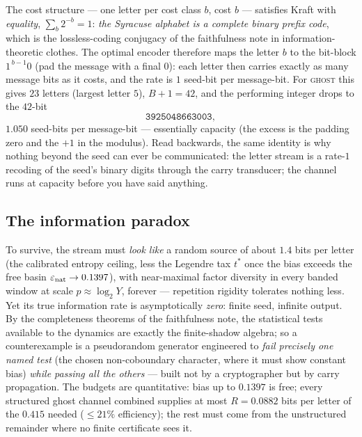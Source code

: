 \documentclass[10pt]{article}
\begin{document}
The cost structure --- one letter per cost class $b$, cost $b$ ---
satisfies Kraft with \emph{equality}, $\sum_b 2^{-b}=1$: \emph{the
Syracuse alphabet is a complete binary prefix code}, which is the
lossless-coding conjugacy of the faithfulness note in
information-theoretic clothes. The optimal encoder therefore maps the
letter $b$ to the bit-block $1^{\,b-1}0$ (pad the message with a final
$0$): each letter then carries exactly as many message bits as it
costs, and the rate is $1$ seed-bit per message-bit. For
\textsc{ghost} this gives $23$ letters (largest letter $5$),
$B+1=42$, and the performing integer drops to the $42$-bit
\[
\texttt{3925048663003},
\]
$1.050$ seed-bits per message-bit --- essentially capacity (the excess
is the padding zero and the $+1$ in the modulus). Read backwards, the
same identity is why nothing beyond the seed can ever be communicated:
the letter stream is a rate-$1$ recoding of the seed's binary digits
through the carry transducer; the channel runs at capacity before you
have said anything.

\subsection*{The information paradox}
To survive, the stream must \emph{look like} a random source of about
$1.4$ bits per letter (the calibrated entropy ceiling, less the
Legendre tax $t^*$ once the bias exceeds the free basin
$\varepsilon_{\rm nat}\to0.1397$), with near-maximal factor diversity
in every banded window at scale $p\approx\log_2Y$, forever ---
repetition rigidity tolerates nothing less. Yet its true information
rate is asymptotically \emph{zero}: finite seed, infinite output. By
the completeness theorems of the faithfulness note, the statistical
tests available to the dynamics are exactly the finite-shadow algebra;
so a counterexample is a pseudorandom generator engineered to
\emph{fail precisely one named test} (the chosen non-coboundary
character, where it must show constant bias) \emph{while passing all
the others} --- built not by a cryptographer but by carry propagation.
The budgets are quantitative: bias up to $0.1397$ is free; every
structured ghost channel combined supplies at most $R=0.0882$ bits per
letter of the $0.415$ needed ($\le21\%$ efficiency); the rest must come
from the unstructured remainder where no finite certificate sees it.
\end{document}
